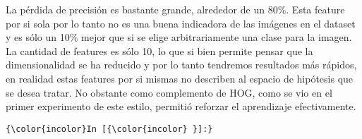 \documentclass[10pt]{article}
\begin{document}
    La pérdida de precisión es bastante grande, alrededor de un 80\%. Esta
feature por si sola por lo tanto no es una buena indicadora de las
imágenes en el dataset y es sólo un 10\% mejor que si se elige
arbitrariamente una clase para la imagen. La cantidad de features es
sólo 10, lo que si bien permite pensar que la dimensionalidad se ha
reducido y por lo tanto tendremos resultados más rápidos, en realidad
estas features por si mismas no describen al espacio de hipótesis que se
desea tratar. No obstante como complemento de HOG, como se vio en el
primer experimento de este estilo, permitió reforzar el aprendizaje
efectivamente.

    \begin{Verbatim}[commandchars=\\\{\}]
{\color{incolor}In [{\color{incolor} }]:} 
\end{Verbatim}


    
    
    
    
\end{document}
